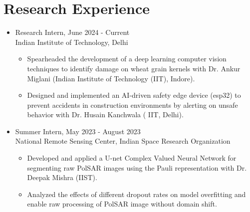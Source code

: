 \documentclass[11pt]{article}
\begin{document}
	\section*{\bf Research Experience}
	\begin{itemize}[leftmargin=*,noitemsep,topsep=0pt]
		
		\item Research Intern, \hfill June 2024 - Current \\
		Indian Institute of Technology, Delhi
		\begin{itemize}[leftmargin=*,noitemsep,topsep=0pt]
			\item Spearheaded the development of a deep learning computer vision techniques to identify damage on wheat grain kernels with Dr. Ankur Miglani (Indian Institute of Technology (IIT), Indore).
			\item Designed and implemented an AI-driven safety edge device (esp32) to prevent accidents in construction environments by alerting on unsafe behavior with Dr. Husain Kanchwala ( IIT, Delhi).
		\end{itemize}
		
		
		\item Summer Intern, \hfill May 2023 - August 2023\\
		National Remote Sensing Center, Indian Space Research Organization
		
		\begin{itemize}[leftmargin=*,noitemsep,topsep=0pt]			
			\item Developed and applied a U-net Complex Valued Neural Network for segmenting raw PolSAR images using the Pauli representation with Dr. Deepak Mishra (IIST).
			 \item Analyzed the effects of  different dropout rates on model overfitting and enable raw processing of PolSAR image without domain shift. 
		\end{itemize}
		

\end{itemize}
\end{document}
